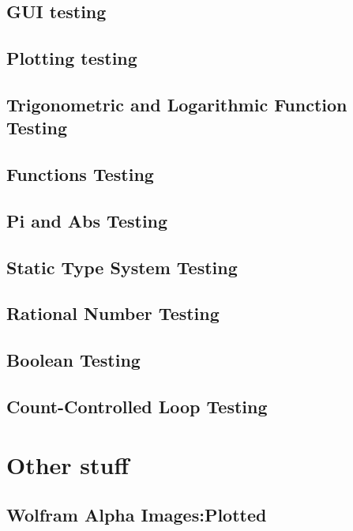 \documentclass[a4paper, oneside, 11pt]{report}
\begin{document}
    \section{GUI testing}

    \section{Plotting testing}

    \section{Trigonometric and Logarithmic Function Testing}
    \section{Functions Testing}
    \section{Pi and Abs Testing}
    \section{Static Type System Testing}
    \section{Rational Number Testing}
    \section{Boolean Testing}
    \section{Count-Controlled Loop Testing}

    \chapter{Other stuff}
    \section{Wolfram Alpha Images:Plotted} \label{WolframPlotted}
\end{document}
